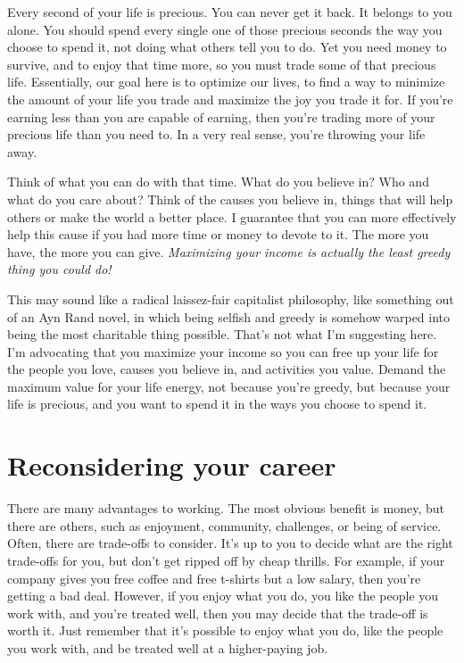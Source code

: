 Every second of your life is precious. You can never get it back. It belongs to you alone. You should spend every single one of those precious seconds the way you choose to spend it, not doing what others tell you to do. Yet you need money to survive, and to enjoy that time more, so you must trade some of that precious life. Essentially, our goal here is to optimize our lives, to find a way to minimize the amount of your life you trade and maximize the joy you trade it for. If you're earning less than you are capable of earning, then you're trading more of your precious life than you need to. In a very real sense, you're throwing your life away.

Think of what you can do with that time. What do you believe in? Who and what do you care about? Think of the causes you believe in, things that will help others or make the world a better place. I guarantee that you can more effectively help this cause if you had more time or money to devote to it. The more you have, the more you can give. \emph{Maximizing your income is actually the least greedy thing you could do!}

This may sound like a radical laissez-fair capitalist philosophy, like something out of an Ayn Rand novel, in which being selfish and greedy is somehow warped into being the most charitable thing possible. That's not what I'm suggesting here. I'm advocating that you maximize your income so you can free up your life for the people you love, causes you believe in, and activities you value. Demand the maximum value for your life energy, not because you're greedy, but because your life is precious, and you want to spend it in the ways you choose to spend it.

\section{Reconsidering your career}
There are many advantages to working. The most obvious benefit is money, but there are others, such as enjoyment, community, challenges, or being of service. Often, there are trade-offs to consider. It's up to you to decide what are the right trade-offs for you, but don't get ripped off by cheap thrills. For example, if your company gives you free coffee and free t-shirts but a low salary, then you're getting a bad deal. However, if you enjoy what you do, you like the people you work with, and you're treated well, then you may decide that the trade-off is worth it. Just remember that it's possible to enjoy what you do, like the people you work with, and be treated well at a higher-paying job.

